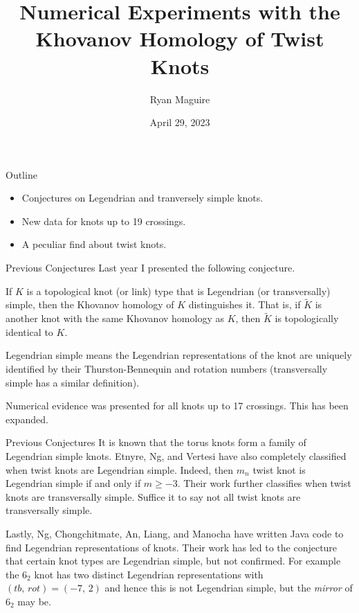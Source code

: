 \documentclass{beamer}
\title{Numerical Experiments with the Khovanov Homology of Twist Knots}
\author{Ryan Maguire}
\date{April 29, 2023}
\begin{document}
    \maketitle
    \begin{frame}{Outline}
        \begin{itemize}
            \item Conjectures on Legendrian and tranversely simple knots.
            \item New data for knots up to 19 crossings.
            \item A peculiar find about twist knots.
        \end{itemize}
    \end{frame}
    \begin{frame}{Previous Conjectures}
        Last year I presented the following conjecture.
        \begin{flushleft}
            If $K$ is a topological knot (or link) type that is Legendrian
            (or transversally) simple, then the Khovanov homology of $K$
            distinguishes it. That is, if $\tilde{K}$ is another knot with the
            same Khovanov homology as $K$, then $\tilde{K}$ is topologically
            identical to $K$.
        \end{flushleft}
        Legendrian simple means the Legendrian representations of the knot
        are uniquely identified by their Thurston-Bennequin and rotation
        numbers (transversally simple has a similar definition).
        \par\hfill\par
        Numerical evidence was presented for all knots up to 17 crossings.
        This has been expanded.
    \end{frame}
    \begin{frame}{Previous Conjectures}
        It is known that the torus knots form a family of Legendrian simple
        knots. Etnyre, Ng, and Vertesi have also completely classified when
        twist knots are Legendrian simple. Indeed, then $m_{n}$ twist knot is
        Legendrian simple if and only if $m\geq{-3}$. Their work further
        classifies when twist knots are transversally simple. Suffice it to say
        not all twist knots are transversally simple.
        \par\hfill\par
        Lastly, Ng, Chongchitmate, An, Liang, and Manocha have written Java
        code to find Legendrian representations of knots. Their work has led
        to the conjecture that certain knot types are Legendrian simple, but
        not confirmed. For example the $6_{2}$ knot has two
        distinct Legendrian representations with $(tb,\,rot)=(-7,\,2)$ and
        hence this is not Legendrian simple, but the \textit{mirror} of $6_{2}$
        may be.
    \end{frame}
\end{document}
